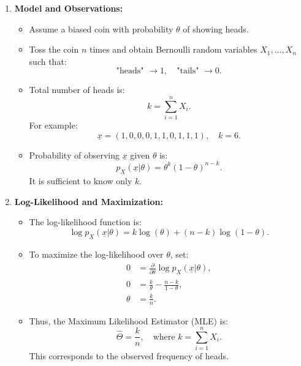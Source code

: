 \begin{example}
    \begin{enumerate}
        \item \textbf{Model and Observations:}
        \begin{itemize}
            \item Assume a biased coin with probability $\theta$ of showing heads. 
            \item Toss the coin $n$ times and obtain Bernoulli random variables $X_1, \dots, X_n$ such that:
            \[
            \text{"heads" } \to 1, \quad \text{"tails" } \to 0.
            \]
            \item Total number of heads is:
            \[
            k = \sum_{i=1}^n X_i.
            \]
            For example:
            \[
            \underline{x} = (1, 0, 0, 0, 1, 1, 0, 1, 1, 1), \quad k = 6.
            \]
            \item Probability of observing $\underline{x}$ given $\theta$ is:
            \[
            p_{\underline{X}}(\underline{x} | \theta) = \theta^k (1 - \theta)^{n - k}.
            \]
            It is sufficient to know only $k$.
        \end{itemize}
        
        \item \textbf{Log-Likelihood and Maximization:}
        \begin{itemize}
            \item The log-likelihood function is:
            \[
            \log p_{\underline{X}}(\underline{x} | \theta) = k \log(\theta) + (n - k) \log(1 - \theta).
            \]
            \item To maximize the log-likelihood over $\theta$, set:
            \begin{align*}
            0 &= \frac{\partial}{\partial \theta} \log p_{\underline{X}}(\underline{x} | \theta), \\
            0 &= \frac{k}{\theta} - \frac{n - k}{1 - \theta}, \\
            \theta &= \frac{k}{n}.
            \end{align*}
            \item Thus, the Maximum Likelihood Estimator (MLE) is:
            \[
            \hat{\Theta} = \frac{k}{n}, \quad \text{where } k = \sum_{i=1}^n X_i.
            \]
            This corresponds to the observed frequency of heads.
        \end{itemize}
        

\end{enumerate}
\end{example}
